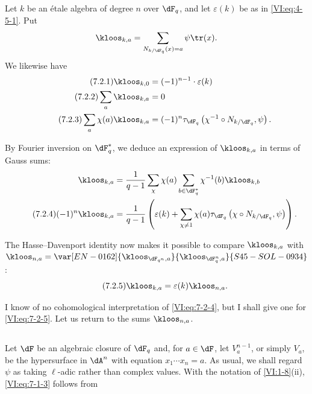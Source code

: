 \subsection{}\label{VI:7-2}

Let $k$ be an étale algebra of degree $n$ over $\dF_q$, and let $\varepsilon(k)$ 
be as in \eqref{VI:eq:4-5-1}. Put 
\[
  \kloos_{k,a} = \sum_{N_{k/\dF_q}(x)=a} \psi \tr(x) \text{.} 
\]
We likewise have 
\begin{align*}\tag{7.2.1}\label{VI:eq:7-2-1}
  \kloos_{k,0} &= (-1)^{n-1} \cdot \varepsilon(k) \\ \tag{7.2.2}\label{VI:eq:7-2-2}
  \sum_a \kloos_{k,a} &= 0 \\ \tag{7.2.3}\label{VI:eq:7-2-3}
  \sum_a \chi(a) \kloos_{k,a} &= (-1)^n \tau_{\dF_q}\left(\chi^{-1}\circ N_{k/\dF_q},\psi\right) \text{.} 
\end{align*}

By Fourier inversion on $\dF_q^\ast$, we deduce an expression of 
$\kloos_{k,a}$ in terms of Gauss sums: 
\begin{align*} 
  \kloos_{k,a} &= \frac{1}{q-1} \sum_\chi \chi(a) \sum_{b\in \dF_q^\ast} \chi^{-1}(b) \kloos_{k,b} \\ \tag{7.2.4}\label{VI:eq:7-2-4}
  (-1)^n \kloos_{k,a} &= \frac{1}{q-1} \left(\varepsilon(k) + \sum_{\chi\ne 1} \chi(a) \tau_{\dF_q}\left(\chi\circ N_{k/\dF_q},\psi\right) \right) \text{.} 
\end{align*}

The Hasse--Davenport identity now makes it possible to compare $\kloos_{k,a}$ 
with $\kloos_{n,a} = \var[EN-0162]{\kloos_{\dF_{q^n},a}}{\kloos_{\dF_q^n,a}}{S45-SOL-0934}$: 
\begin{equation*}\tag{7.2.5}\label{VI:eq:7-2-5}
  \kloos_{k,a} = \varepsilon(k) \kloos_{n,a} \text{.} 
\end{equation*}

I know of no cohomological interpretation of \eqref{VI:eq:7-2-4}, but 
I shall give one for \eqref{VI:eq:7-2-5}. Let us return to the sums $\kloos_{n,a}$. 





\subsection{}\label{VI:7-3}

Let $\dF$ be an algebraic closure of $\dF_q$ and, for $a\in \dF$, let 
$V_a^{n-1}$, or simply $V_a$, be the hypersurface in $\dA^n$ with equation 
$x_1 \dotsm x_n=a$. As usual, we shall regard $\psi$ as taking 
$\ell$-adic rather than complex values. With the notation of 
\ref{VI:1-8}(ii), \eqref{VI:eq:7-1-3} follows from 





